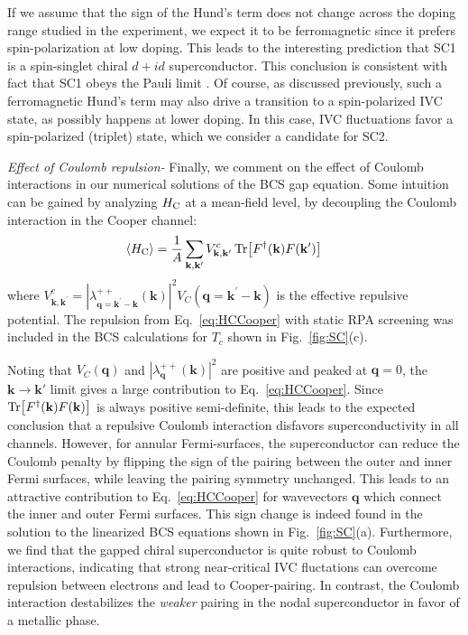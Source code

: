 \documentclass[aps,pra,twocolumn,superscriptaddress,10pt,article,nofootinbib,showpacs,longbibliography]{revtex4-1}
\def \k{{\mathbf k}}
\def \q{{\mathbf q}}
\def \beq{\begin{eqnarray}}
\def \eeq{\end{eqnarray}}
\begin{document}
If we assume that the sign of the Hund's term does not change across the doping range studied in the experiment, we expect it to be ferromagnetic since it prefers spin-polarization at low doping. 
This leads to the interesting prediction that SC1 is a spin-singlet chiral $d + id$ superconductor. 
This conclusion is  consistent with fact that SC1 obeys the Pauli limit \cite{Zhou_ABCSC}.
Of course, as discussed previously, such a ferromagnetic Hund's term may also drive a transition to a spin-polarized IVC state, as possibly happens at lower doping. 
In this case, IVC fluctuations favor a spin-polarized (triplet) state, which we consider a candidate for SC2. 


\emph{Effect of Coulomb repulsion-}
Finally, we comment on the effect of Coulomb interactions in our numerical solutions of the BCS gap equation.
Some intuition can be gained by analyzing $H_{\rm C}$ at a mean-field level, by decoupling the Coulomb interaction in the Cooper channel:
\beq
\langle H_{\rm C} \rangle = \frac{1}{A} \sum_{\k,\k^\prime} V^c_{\k, \k^\prime} \Tr[F^\dagger(\k) F(\k^\prime)]~~~~~
\label{eq:HCCooper}
\eeq
where $V^c_{\k, \k^\prime} = |\lambda^{++}_{\q = \k^\prime - \k}(\k)|^2 V_C(\q = \k^\prime - \k)$ is the effective repulsive potential.
The repulsion from Eq.~\eqref{eq:HCCooper} with static RPA screening was included in the BCS calculations for $T_c$ shown in Fig.~\ref{fig:SC}(c).

Noting that $V_C(\q)$ and $|\lambda^{++}_{\q}(\k)|^2$ are positive and peaked at $\q = 0$, the $\mathbf{k} \to \mathbf{k}'$ limit gives a large contribution to Eq.~\eqref{eq:HCCooper}. 
Since $\Tr[F^\dagger(\k) F(\k)]$ is always positive semi-definite, this leads to the expected conclusion that a repulsive Coulomb interaction disfavors superconductivity in all channels. 
However, for annular Fermi-surfaces, the superconductor can reduce the Coulomb penalty by flipping the sign of the pairing between the outer and inner Fermi surfaces, while leaving the  pairing symmetry unchanged.
This leads to an attractive contribution to Eq.~\eqref{eq:HCCooper} for wavevectors $\mathbf{q}$ which connect the inner and outer Fermi surfaces.
This sign change is indeed found in the solution to the linearized BCS equations shown in Fig.~\ref{fig:SC}(a). 
Furthermore, we find that the gapped chiral superconductor is quite  robust to Coulomb interactions, indicating that strong near-critical IVC fluctations can overcome repulsion between electrons and lead to Cooper-pairing.
In contrast,  the Coulomb interaction destabilizes the \textit{weaker} pairing in the nodal superconductor in favor of a metallic phase.
\end{document}
